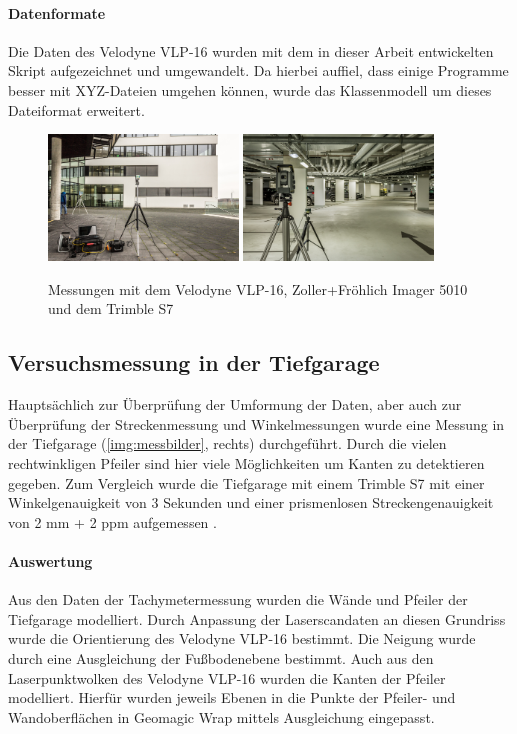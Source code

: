 \documentclass[a4paper,12pt,bibliography=totoc, listof=totoc,titlepage,pointlessnumbers]{scrreprt}
\begin{document}
\paragraph{Datenformate}
Die Daten des Velodyne VLP-16 wurden mit dem in dieser Arbeit entwickelten Skript aufgezeichnet und umgewandelt. Da hierbei auffiel, dass einige Programme besser mit XYZ-Dateien umgehen können, wurde das Klassenmodell um dieses Dateiformat erweitert.

\begin{figure}[!ht]
 \centering
 \includegraphics[width=0.45\textwidth]{./img/fassade.jpg}
 \includegraphics[width=0.45\textwidth]{./img/tiefgarage.jpg}
 \caption{Messungen mit dem Velodyne VLP-16, Zoller+Fröhlich Imager 5010 und dem Trimble S7}
 \label{img:messbilder}
\end{figure}

\subsection{Versuchsmessung in der Tiefgarage}
Hauptsächlich zur Überprüfung der Umformung der Daten, aber auch zur Überprüfung der Streckenmessung und Winkelmessungen wurde eine Messung in der Tiefgarage (\autoref{img:messbilder}, rechts) durchgeführt. Durch die vielen rechtwinkligen Pfeiler sind hier viele Möglichkeiten um Kanten zu detektieren gegeben. Zum Vergleich wurde die Tiefgarage mit einem Trimble S7 mit einer Winkelgenauigkeit von 3 Sekunden und einer prismenlosen Streckengenauigkeit von 2 mm + 2 ppm aufgemessen \citep{trimbles7}.

\paragraph{Auswertung}
Aus den Daten der Tachymetermessung wurden die Wände und Pfeiler der Tiefgarage modelliert. Durch Anpassung der Laserscandaten an diesen Grundriss wurde die Orientierung des Velodyne VLP-16 bestimmt. Die Neigung wurde durch eine Ausgleichung der Fußbodenebene bestimmt. Auch aus den Laserpunktwolken des Velodyne VLP-16 wurden die Kanten der Pfeiler modelliert. Hierfür wurden jeweils Ebenen in die Punkte der Pfeiler- und Wandoberflächen in Geomagic Wrap mittels Ausgleichung eingepasst.
\end{document}
